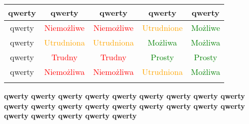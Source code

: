 \documentclass{beamer}
\begin{document}
    \begin{frame}[plain]
        \begin{center}
            \begin{small}
                \begin{tabular}{c c c c c}
                    \toprule
                    \textbf{qwerty} & \textbf{qwerty} & \textbf{qwerty} & \textbf{qwerty} & \textbf{qwerty}\\
                    \midrule
                    {qwerty} & \textcolor{red}{Niemożliwe} & \textcolor{red}{Niemożliwe} & \textcolor{orange}{Utrudnione} & \textcolor{green}{Możliwe}\\                      \midrule
                    \pause
                    {qwerty} & \textcolor{orange}{Utrudniona} & \textcolor{orange}{Utrudniona} & \textcolor{green}{Możliwa} & \textcolor{green}{Możliwa}\\                      \midrule
                    \pause
                    {qwerty} & \textcolor{red}{Trudny} & \textcolor{red}{Trudny} & \textcolor{green}{Prosty} & \textcolor{green}{Prosty}\\                       \midrule
                    \pause
                    {qwerty} & \textcolor{red}{Niemożliwa} & \textcolor{red}{Niemożliwa} &    \textcolor{orange}{Utrudniona} & \textcolor{green}{Możliwa}\\                      \bottomrule
                    \pause
                \end{tabular}
            \end{small}

            \textbf{qwerty qwerty qwerty qwerty qwerty qwerty qwerty qwerty qwerty qwerty qwerty    qwerty    qwerty qwerty qwerty qwerty qwerty qwerty qwerty qwerty qwerty qwerty qwerty }
        \end{center}
    \end{frame}
\end{document}
